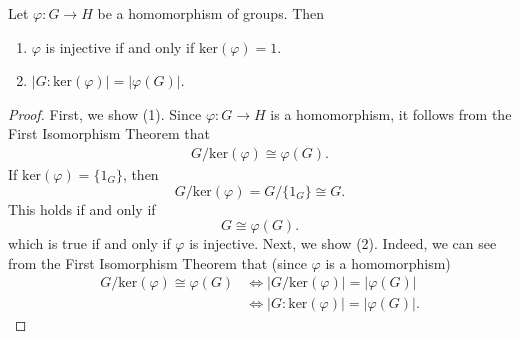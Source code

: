 \documentclass[a4paper]{article}
\begin{document}
\begin{corollary}[17]
   Let \( \varphi : G \to H  \) be a homomorphism of groups. Then 
   \begin{enumerate}
       \item[(1)] \( \varphi \) is injective if and only if \( \text{ker}(\varphi) = 1  \).
        \item[(2)] \( | G : \text{ker}(\varphi) |  = | \varphi(G) | \).
   \end{enumerate}
\end{corollary}
\begin{proof}
    First, we show (1). Since \( \varphi : G \to H  \) is a homomorphism, it follows from the First Isomorphism Theorem that
    \begin{align*}
        G / \text{ker}(\varphi) \cong \varphi(G).
    \end{align*}
    If \( \text{ker}(\varphi) = \{ {1}_{G} \}  \), then 
    \[  G / \text{ker}(\varphi) = G / \{ {1}_{G} \}  \cong G.  \]
    This holds if and only if
    \[  G \cong \varphi(G). \]
    which is true if and only if \( \varphi   \) is injective.
    Next, we show (2). Indeed, we can see from the First Isomorphism Theorem that (since \( \varphi \) is a homomorphism)
\begin{align*}
    G / \text{ker}(\varphi) \cong \varphi(G) &\iff | G / \text{ker}(\varphi) | = | \varphi(G) |  \\
                                             &\iff | G : \text{ker}(\varphi) |  = | \varphi(G) |.
\end{align*}
\end{proof}
\end{document}
